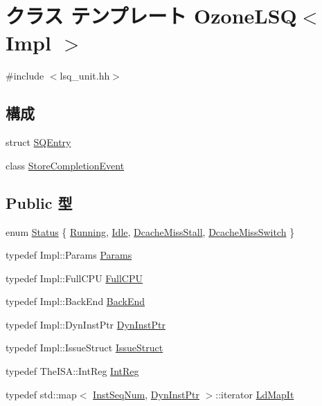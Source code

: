 \hypertarget{classOzoneLSQ}{
\section{クラス テンプレート OzoneLSQ$<$ Impl $>$}
\label{classOzoneLSQ}
}


{\ttfamily \#include $<$lsq\_\-unit.hh$>$}\subsection*{構成}
\begin{DoxyCompactItemize}
\item 
struct \hyperlink{structOzoneLSQ_1_1SQEntry}{SQEntry}
\item 
class \hyperlink{classOzoneLSQ_1_1StoreCompletionEvent}{StoreCompletionEvent}
\end{DoxyCompactItemize}
\subsection*{Public 型}
\begin{DoxyCompactItemize}
\item 
enum \hyperlink{classOzoneLSQ_a67a0db04d321a74b7e7fcfd3f1a3f70b}{Status} \{ \hyperlink{classOzoneLSQ_a67a0db04d321a74b7e7fcfd3f1a3f70ba2f5f2c4a8c4f4f0519d503dcdfbf55cb}{Running}, 
\hyperlink{classOzoneLSQ_a67a0db04d321a74b7e7fcfd3f1a3f70bad3fa9ae9431d6cb1772f9d9df48cab19}{Idle}, 
\hyperlink{classOzoneLSQ_a67a0db04d321a74b7e7fcfd3f1a3f70ba4ba5ae5815b190bd652669e2fdea5ed7}{DcacheMissStall}, 
\hyperlink{classOzoneLSQ_a67a0db04d321a74b7e7fcfd3f1a3f70bad01f64e5e67cc64e6ad4152f187a034d}{DcacheMissSwitch}
 \}
\item 
typedef Impl::Params \hyperlink{classOzoneLSQ_a818e103eae798a24a06a0a34631849ea}{Params}
\item 
typedef Impl::FullCPU \hyperlink{classOzoneLSQ_a90ba84e54618cc07f2e8f05e046cb5ce}{FullCPU}
\item 
typedef Impl::BackEnd \hyperlink{classOzoneLSQ_a3de526baa0cbb2b55bf669a6f7bf81cc}{BackEnd}
\item 
typedef Impl::DynInstPtr \hyperlink{classOzoneLSQ_a028ce10889c5f6450239d9e9a7347976}{DynInstPtr}
\item 
typedef Impl::IssueStruct \hyperlink{classOzoneLSQ_a568c86f6403070f1cb743e994405ba8b}{IssueStruct}
\item 
typedef TheISA::IntReg \hyperlink{classOzoneLSQ_a1355cb78d031430d4d70eb5080267604}{IntReg}
\item 
typedef std::map$<$ \hyperlink{inst__seq_8hh_a258d93d98edaedee089435c19ea2ea2e}{InstSeqNum}, \hyperlink{classOzoneLSQ_a028ce10889c5f6450239d9e9a7347976}{DynInstPtr} $>$::iterator \hyperlink{classOzoneLSQ_a8b43ca5318a59872c61492868e50bab6}{LdMapIt}
\end{DoxyCompactItemize}
